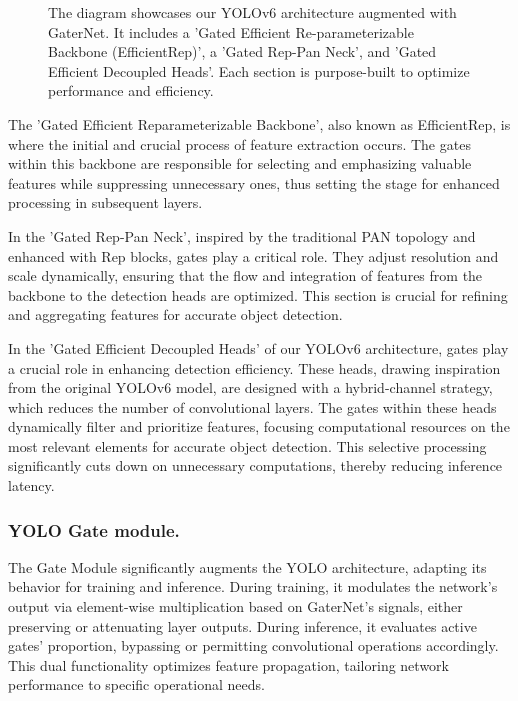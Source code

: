 \documentclass[runningheads]{llncs}
\begin{document}
\begin{figure}[ht]
\centering

\caption{The diagram showcases our YOLOv6 architecture augmented with GaterNet. It includes a 'Gated Efficient Re-parameterizable Backbone (EfficientRep)', a 'Gated Rep-Pan Neck', and 'Gated Efficient Decoupled Heads'. Each section is purpose-built to optimize performance and efficiency.}
\label{fig:yolo_architecture}
\end{figure}

The 'Gated Efficient Reparameterizable Backbone', also known as EfficientRep, is where the initial and crucial process of feature extraction occurs. The gates within this backbone are responsible for selecting and emphasizing valuable features while suppressing unnecessary ones, thus setting the stage for enhanced processing in subsequent layers.

In the 'Gated Rep-Pan Neck', inspired by the traditional PAN topology and enhanced with Rep blocks, gates play a critical role. They adjust resolution and scale dynamically, ensuring that the flow and integration of features from the backbone to the detection heads are optimized. This section is crucial for refining and aggregating features for accurate object detection.

In the 'Gated Efficient Decoupled Heads' of our YOLOv6 architecture, gates play a crucial role in enhancing detection efficiency. These heads, drawing inspiration from the original YOLOv6 model, are designed with a hybrid-channel strategy, which reduces the number of convolutional layers. The gates within these heads dynamically filter and prioritize features, focusing computational resources on the most relevant elements for accurate object detection. This selective processing significantly cuts down on unnecessary computations, thereby reducing inference latency.

\subsubsection{YOLO Gate module.} The Gate Module significantly augments the YOLO architecture, adapting its behavior for training and inference. During training, it modulates the network’s output via element-wise multiplication based on GaterNet's signals, either preserving or attenuating layer outputs. During inference, it evaluates active gates' proportion, bypassing or permitting convolutional operations accordingly. This dual functionality optimizes feature propagation, tailoring network performance to specific operational needs.
\end{document}
